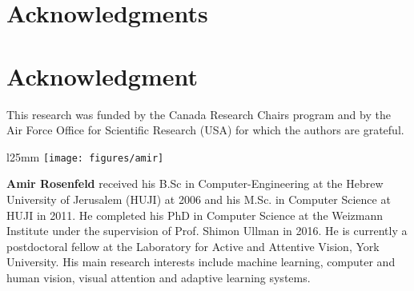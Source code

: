 \documentclass[10pt,journal,compsoc]{IEEEtran}
\begin{document}
  \section*{Acknowledgments}
\else
  \section*{Acknowledgment}
\fi


This research was funded by the Canada Research Chairs program and by the Air Force Office for Scientific Research (USA) for which the authors are grateful.




% 


\ifCLASSOPTIONcaptionsoff
  \newpage
\fi

 \begin{wrapfigure}{l}{25mm} 
    \texttt{[image: figures/amir]}
  \end{wrapfigure}\par
  \textbf{Amir Rosenfeld} received his B.Sc in Computer-Engineering at the Hebrew University of Jerusalem (HUJI) at 2006
and his M.Sc. in Computer Science at HUJI in 2011. He completed his PhD in Computer Science at the Weizmann Institute under the supervision of Prof. Shimon Ullman in 2016. He is currently a postdoctoral fellow at the Laboratory for Active and Attentive Vision, York University. His main research interests include machine learning, computer and human vision, visual attention and adaptive learning systems.\par
\vspace{10px}
\end{document}
